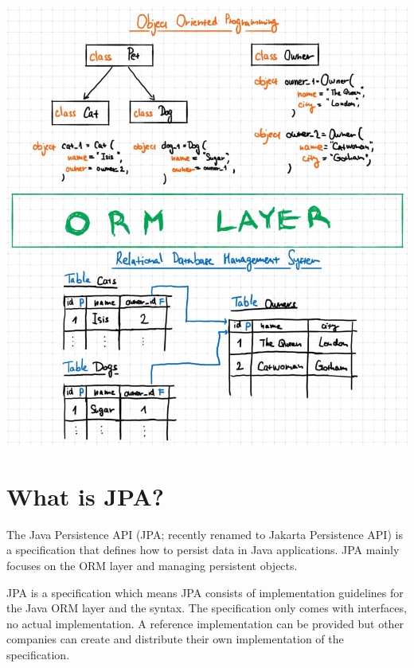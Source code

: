 \includegraphics[width=\textwidth]{./images/chapter6/orm}


\section{What is JPA?}

The Java Persistence API (JPA; recently renamed to Jakarta Persistence API) is a specification that defines how to persist data in Java applications. JPA mainly focuses on the ORM layer and managing persistent objects.

JPA is a specification which means JPA consists of implementation guidelines for the Java ORM layer and the syntax. The specification only comes with interfaces, no actual implementation.  A reference implementation can be provided but other companies can create and distribute their own implementation of the specification.


